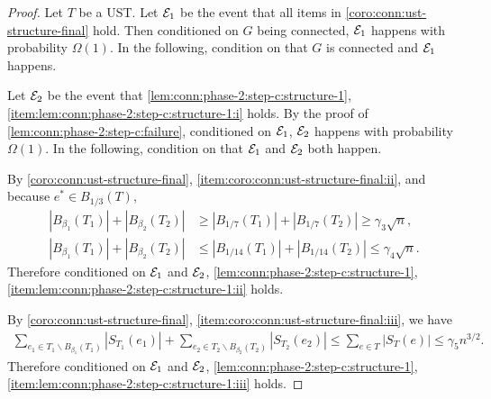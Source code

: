 \begin{proof}
  Let $T$ be a UST.
  Let $\mathcal{E}_1$ be the event that all items in \cref{coro:conn:ust-structure-final} hold.
  Then conditioned on $G$ being connected, $\mathcal{E}_1$ happens with probability $\Omega(1)$.
  In the following, condition on that $G$ is connected and $\mathcal{E}_1$ happens.

  Let $\mathcal{E}_2$ be the event that \cref{lem:conn:phase-2:step-c:structure-1}, \cref{item:lem:conn:phase-2:step-c:structure-1:i} holds.
  By the proof of \cref{lem:conn:phase-2:step-c:failure}, conditioned on $\mathcal{E}_1$, $\mathcal{E}_2$ happens with probability $\Omega(1)$.
  In the following, condition on that $\mathcal{E}_1$ and $\mathcal{E}_2$ both happen.

  By \cref{coro:conn:ust-structure-final}, \cref{item:coro:conn:ust-structure-final:ii}, and because $e^*\in B_{1/3}(T)$,
  \begin{align*}
    \left| B_{\beta_1}(T_1) \right| + \left| B_{\beta_2}(T_2) \right|&\ge \left| B_{1/7}(T_1) \right| + \left| B_{1/7}(T_2) \right| \ge \gamma_3 \sqrt n,\\
    \left| B_{\beta_1}(T_1) \right| + \left| B_{\beta_2}(T_2) \right|&\le \left| B_{1/14}(T_1) \right| + \left| B_{1/14}(T_2) \right| \le \gamma_4 \sqrt n.
  \end{align*}
  Therefore conditioned on $\mathcal{E}_1$ and $\mathcal{E}_2$, \cref{lem:conn:phase-2:step-c:structure-1}, \cref{item:lem:conn:phase-2:step-c:structure-1:ii} holds.

  By \cref{coro:conn:ust-structure-final}, \cref{item:coro:conn:ust-structure-final:iii}, we have
  \begin{align*}
    \sum_{e_1\in T_1\backslash B_{\beta_1}(T_1)} \left| S_{T_1}(e_1) \right| + \sum_{e_2\in T_2\backslash B_{\beta_2}(T_2)} \left| S_{T_2}(e_2) \right|
    \le \sum_{e\in T} \left| S_T(e) \right| \le \gamma_5 n^{3/2}.
  \end{align*}
  Therefore conditioned on $\mathcal{E}_1$ and $\mathcal{E}_2$, \cref{lem:conn:phase-2:step-c:structure-1}, \cref{item:lem:conn:phase-2:step-c:structure-1:iii} holds.
\end{proof}

